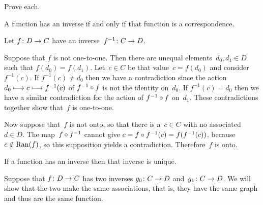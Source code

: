 \documentclass{test}  %
\begin{document}
\begin{problem} \label{PropertiesOfInverses}
Prove each.
\begin{exes}
\begin{exercise} 
  A function has an inverse if and only if that 
  function is a correspondence.
\end{exercise}
\begin{answer}
  Let $\mbox{$f\colon D\to C$}$ have an inverse~$\mbox{$f^{-1}\colon C\to D$}$.

  Suppose that $f$ is not one-to-one.
  Then there are unequal elements~$d_0,d_1\in D$
  such that $f(d_0)=f(d_1)$.
  Let~$c\in C$ be that value~$c=f(d_0)$ and consider~$f^{-1}(c)$.
  If $f^{-1}(c)\neq d_0$ then we have a contradiction since the 
  action $d_0\stackrel{}{\longmapsto}c\stackrel{}{\longmapsto}f^{-1}(c)$
  of $f^{-1}\mathbin{\circ} f$ is not the identity on~$d_0$.
  If $f^{-1}(c)=d_0$ then we have a similar contradiction for the
  action of $f^{-1}\mathbin{\circ} f$ on~$d_1$.
  These contradictions together show that~$f$ is one-to-one.
   
  Now suppose that~$f$ is not onto,
  so that there is a~$c\in C$ with no associated~$d\in D$.
  The map~$f\mathbin{\circ} f^{-1}$
  cannot give $c=f\mathbin{\circ} f^{-1}(c)=f(f^{-1}(c))$, 
  because $c\notin\operatorname{Ran}(f)$, so this supposition yields a contradiction.
  Therefore~$f$ is onto.  
\end{answer}
\begin{exercise} 
  If a function has an inverse then that inverse
  is unique.
\end{exercise}
\begin{answer}
  Suppose that $\mbox{$f\colon D\to C$}$ has two inverses $\mbox{$g_0\colon C\to D$}$
  and~$\mbox{$g_1\colon C\to D$}$.
  We will show that the two make the same associations, that is, they 
  have the same graph and
  thus are the same function.


\end{answer}
\end{exes}
\end{problem}
\end{document}
